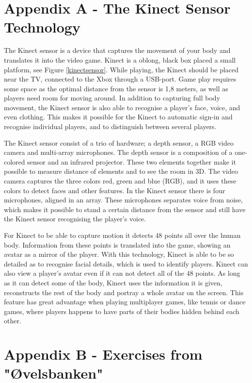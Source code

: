 \appendix

\section*{Appendix A - The Kinect Sensor Technology}
\label{app:kinectsensortech}
The Kinect sensor is a device that captures the movement of your body and translates it into the video game. Kinect is a oblong, black box placed a small platform, see Figure \ref{kinectsensor}. While playing, the Kinect should be placed near the TV, connected to the Xbox through a USB-port. Game play requires some space as the optimal distance from the sensor is 1,8 meters, as well as players need room for moving around. In addition to capturing full body movement, the Kinect sensor is also able to recognise a player's face, voice, and even clothing. This makes it possible for the Kinect to automatic sign-in and recognise individual players, and to distinguish between several players. 

The Kinect sensor consist of a trio of hardware; a depth sensor, a RGB video camera and multi-array microphones. The depth sensor is a composition of a one-colored sensor and an infrared projector. These two elements together make it possible to measure distance of elements and to see the room in 3D. The video camera captures the three colors red, green and blue (RGB), and it uses these colors to detect faces and other features. In the Kinect sensor there is four microphones, aligned in an array. These microphones separates voice from noise, which makes it possible to stand a certain distance from the sensor and still have the Kinect sensor recognising the player's voice.
 
For Kinect to be able to capture motion it detects 48 points all over the human body. Information from these points is translated into the game, showing an avatar as a mirror of the player. With this technology, Kinect is able to be so detailed as to recognise facial details, which is used to identify players. Kinect can also view a player's avatar even if it can not detect all of the 48 points. As long as it can detect some of the body, Kinect uses the information it is given, reconstructs the rest of the body and portray a whole avatar on the screen. This feature has great advantage when playing multiplayer games, like tennis or dance games, where players happens to have parts of their bodies hidden behind each other.

\newpage
\section*{Appendix B - Exercises from "{Ø}velsbanken"}
\label{app:exercises}

